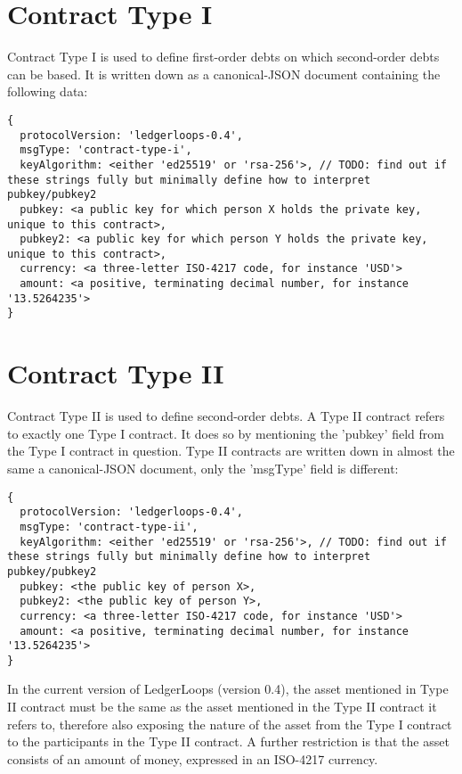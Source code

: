 \documentclass[11pt,twoside,a4paper]{article}
\begin{document}
\section{Contract Type I}
Contract Type I is used to define first-order debts on which second-order debts can be based. It is written down as a canonical-JSON document containing the following data:

\begin{lstlisting}
{
  protocolVersion: 'ledgerloops-0.4',
  msgType: 'contract-type-i',
  keyAlgorithm: <either 'ed25519' or 'rsa-256'>, // TODO: find out if these strings fully but minimally define how to interpret pubkey/pubkey2
  pubkey: <a public key for which person X holds the private key, unique to this contract>,
  pubkey2: <a public key for which person Y holds the private key, unique to this contract>,
  currency: <a three-letter ISO-4217 code, for instance 'USD'>
  amount: <a positive, terminating decimal number, for instance '13.5264235'>
}
\end{lstlisting}


\section{Contract Type II}
Contract Type II is used to define second-order debts. A Type II contract refers to exactly one Type I contract. It does so by mentioning the 'pubkey' field from the Type I contract in question. Type II contracts are written down in almost the same a canonical-JSON document, only the 'msgType' field is different:

\begin{lstlisting}
{
  protocolVersion: 'ledgerloops-0.4',
  msgType: 'contract-type-ii',
  keyAlgorithm: <either 'ed25519' or 'rsa-256'>, // TODO: find out if these strings fully but minimally define how to interpret pubkey/pubkey2
  pubkey: <the public key of person X>,
  pubkey2: <the public key of person Y>,
  currency: <a three-letter ISO-4217 code, for instance 'USD'>
  amount: <a positive, terminating decimal number, for instance '13.5264235'>
}
\end{lstlisting}

In the current version of LedgerLoops (version 0.4), the asset mentioned in Type II contract must be the same as the asset mentioned in the Type II contract it refers to, therefore also exposing the nature of the asset from the Type I contract to the participants in the Type II contract. A further restriction is that the asset consists of an amount of money, expressed in an ISO-4217 currency.
\end{document}
